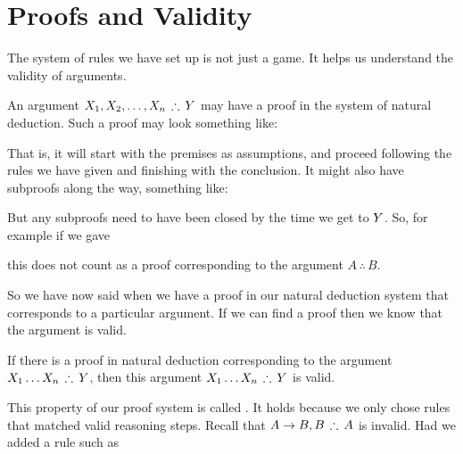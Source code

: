 \solutions


\chapter{Proofs and Validity}


The system of rules we have set up is not just a game. It helps us understand the validity of arguments. 

An argument 
$\metaX_1, \metaX_2, \ldots, \metaX_n\,\therefore\, \metaY$ 
may have a proof in the system of natural deduction. Such a proof may look something like:
\begin{pf}
	\ellipsesline
\end{pf}
That is, it will start with the premises as assumptions, and proceed following the rules we have given and finishing with the conclusion.
It might also have subproofs along the way, something like:
\begin{pf}
	\ellipsesline
	\open
		\ellipsesline
		\open 
		\ellipsesline
		\close
		\ellipsesline
	\close
	\ellipsesline
\end{pf}
But any subproofs need to have been closed by the time we get to $Y$. 
So, for example if we gave 
\begin{pf}
	\open
		\close
\end{pf}
this does not count as a proof corresponding to the argument $A\,\therefore\,B$. 

So we have now said when we have a proof in our natural deduction system that corresponds to a particular argument. If we can find a proof then we know that the argument is valid.
\begin{highlighted}
If there is a proof in natural deduction corresponding to the argument $\metaX_1\ldots\metaX_n\,\therefore\,\metaY$, then this argument $\metaX_1\ldots\metaX_n\,\therefore\,\metaY$ is valid.
\end{highlighted}
This property of our proof system is called . It holds because we only chose rules that matched valid reasoning steps. 
Recall that $A\eif B, B\,\therefore\, A$ is invalid. Had we added a rule such as 
	\begin{pf}
	\ellipsesline
	\ellipsesline
	\ellipsesline
	\end{pf}
	
